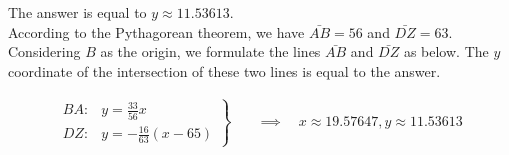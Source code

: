 \begin{solution}
The answer is equal to $y \approx 11.53613$.\\[0.2cm]
According to the Pythagorean theorem, we have $\bar{AB}=56$ and $\bar{DZ}=63$. Considering $B$ as the origin, we formulate the lines $\bar{AB}$ and $\bar{DZ}$ as below. The $y$ coordinate of the intersection of these two lines is equal to the answer. %

$$\begin{align}
\left.
\begin{aligned}
BA:& y = \frac{33}{56} x \\
DZ:& y = -\frac{16}{63}(x - 65)
\end{aligned}
\right\}
\quad &\implies \quad
x \approx 19.57647, y \approx 11.53613
\end{align}$$
\end{solution}
